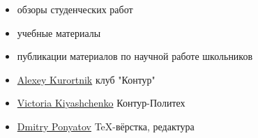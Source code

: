\clearpage
{}

\begin{itemize}[nosep]
\item обзоры студенческих работ
\item учебные материалы
\item публикации материалов по научной работе школьников
\end{itemize}


\begin{itemize}[nosep]
  \item \href{https://vk.com/hack_k715}{Alexey Kurortnik} клуб "Контур"
  \item \href{https://vk.com/kkkshch}{Victoria Kiyashchenko} Контур-Политех
  \item \href{https://vk.com/id266201297}{Dmitry Ponyatov} TeX-вёрстка, редактура
\end{itemize}














